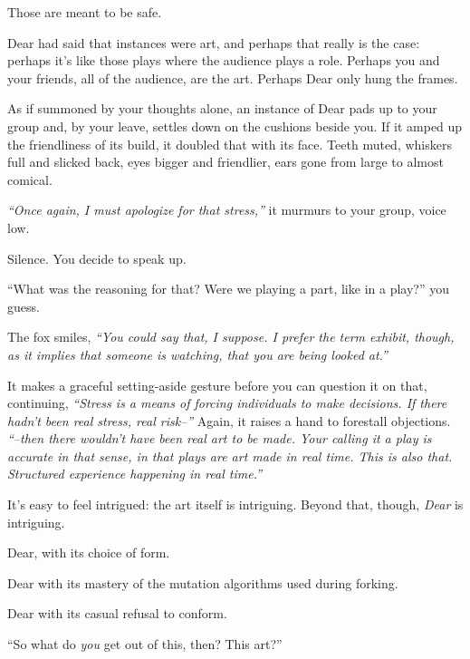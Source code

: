 Those are meant to be safe.

Dear had said that instances were art, and perhaps that really is the case: perhaps it's like those plays where the audience plays a role. Perhaps you and your friends, all of the audience, are the art. Perhaps Dear only hung the frames.

As if summoned by your thoughts alone, an instance of Dear pads up to your group and, by your leave, settles down on the cushions beside you. If it amped up the friendliness of its build, it doubled that with its face. Teeth muted, whiskers full and slicked back, eyes bigger and friendlier, ears gone from large to almost comical.

\emph{``Once again, I must apologize for that stress,''} it murmurs to your group, voice low.

Silence. You decide to speak up.

``What was the reasoning for that? Were we playing a part, like in a play?'' you guess.

The fox smiles, \emph{``You could say that, I suppose. I prefer the term exhibit, though, as it implies that someone is watching, that you are being looked at.''}

It makes a graceful setting-aside gesture before you can question it on that, continuing, \emph{``Stress is a means of forcing individuals to make decisions. If there hadn't been real stress, real risk--''} Again, it raises a hand to forestall objections. \emph{``--then there wouldn't have been real art to be made. Your calling it a play is accurate in that sense, in that plays are art made in real time. This is also that. Structured experience happening in real time.''}

It's easy to feel intrigued: the art itself is intriguing. Beyond that, though, \emph{Dear} is intriguing.

\newpage

\null
\vfill

Dear, with its choice of form.

\null
\vfill

\newpage

\null
\vfill

Dear with its mastery of the mutation algorithms used during forking.

\null
\vfill

\newpage

Dear with its casual refusal to conform.

``So what do \emph{you} get out of this, then? This art?''

